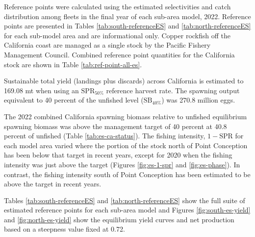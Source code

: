 \documentclass[11pt,
  english,
  letterpaper,
]{article}
\begin{document}
Reference points were calculated using the estimated selectivities and catch distribution among fleets in the final year of each sub-area model, 2022. Reference points are presented in Tables \ref{tab:south-referenceES} and \ref{tab:north-referenceES} for each sub-model area and are informational only. Copper rockfish off the California coast are managed as a single stock by the Pacific Fishery Management Council. Combined reference point quantities for the California stock are shown in Table \ref{tab:ref-point-all-es}.

Sustainable total yield (landings plus discards) across California is estimated to 169.08 mt when using an \(\text{SPR}_{50\%}\) reference harvest rate. The spawning output equivalent to 40 percent of the unfished level (\(\text{SB}_{40\%}\)) was 270.8 million eggs.

The 2022 combined California spawning biomass relative to unfished equilibrium spawning biomass was above the management target of 40 percent at 40.8 percent of unfished (Table \ref{tab:es-ca-status}). The fishing intensity, \(1-\text{SPR}\) for each model area varied where the portion of the stock north of Point Conception has been below that target in recent years, except for 2020 when the fishing intensity was just above the target (Figures \ref{fig:es-1-spr} and \ref{fig:es-phase}). In contrast, the fishing intensity south of Point Conception has been estimated to be above the target in recent years.

Tables \ref{tab:south-referenceES} and \ref{tab:north-referenceES} show the full suite of estimated reference points for each sub-area model and Figures \ref{fig:south-es-yield} and \ref{fig:north-es-yield} show the equilibrium yield curves and net production based on a steepness value fixed at 0.72.

\newpage



\newpage



\begingroup\fontsize{10}{12}\selectfont
\begingroup\fontsize{10}{12}\selectfont
\end{document}

